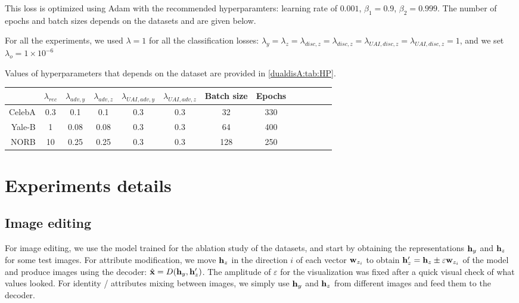 This loss is optimized using Adam with the recommended hyperparamters: learning rate of $0.001$, $\beta_1 = 0.9$, $\beta_2 = 0.999$. The number of epochs and batch sizes depends on the datasets and are given below.

For all the experiments, we used $\lambda = 1$ for all the classification losses:
$\lambda_y = \lambda_z = \lambda_{disc,z} = \lambda_{disc,z} = \lambda_{UAI,disc,z} = \lambda_{UAI,disc,z} = 1$, and we set $\lambda_{o} = 1\times 10^{-6}$

Values of hyperparameters that depends on the dataset are provided in \autoref{dualdisA:tab:HP}.

\begin{table}[H]
    \centering
    \begin{tabular}{rcccccccccccc}
        \toprule
        & $\lambda_{rec}$ & $\lambda_{adv,y}$ & $\lambda_{adv,z}$ & $\lambda_{UAI,adv,y}$ & $\lambda_{UAI,adv,z}$ & Batch size & Epochs \\
        \midrule
        CelebA       & 0.3 & 0.1  & 0.1  & 0.3 & 0.3 & 32 & 330 \\
        Yale-B        & 1   & 0.08 & 0.08 & 0.3 & 0.3 & 64 & 400 \\
        NORB         & 10  & 0.25 & 0.25 & 0.3 & 0.3 & 128 & 250 \\
        \bottomrule
    \end{tabular}
    \label{dualdisA:tab:HP}
\end{table}

\section{Experiments details}

\subsection{Image editing}

For image editing, we use the model trained for the ablation study of the datasets, and start by obtaining the representations $\mathbf{h}_y$ and $\mathbf{h}_z$ for some test images. For attribute modification, we move $\mathbf{h}_z$ in the direction $i$ of each vector $\mathbf{w}_{z_i}$ to obtain $\mathbf{h}_z' = \mathbf{h}_z \pm \varepsilon \mathbf{w}_{z_i}$ of the model and produce images using the decoder: $\hat{\mathbf{x}} = D(\mathbf{h}_y, \mathbf{h}_z')$. The amplitude of $\varepsilon$ for the visualization was fixed after a quick visual check of what values looked.
For identity / attributes mixing between images, we simply use $\mathbf{h}_y$ and $\mathbf{h}_z$ from different images and feed them to the decoder.

